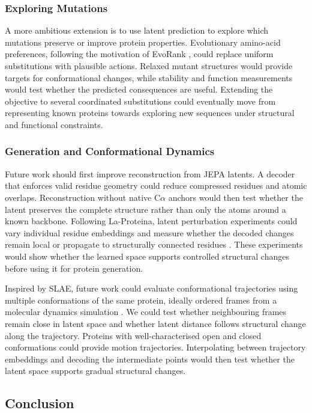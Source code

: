 \subsubsection{Exploring Mutations}

A more ambitious extension is to use latent prediction to explore which mutations preserve or improve protein properties. Evolutionary amino-acid preferences, following the motivation of EvoRank \citep{gong2024evorank}, could replace uniform substitutions with plausible actions. Relaxed mutant structures would provide targets for conformational changes, while stability and function measurements would test whether the predicted consequences are useful. Extending the objective to several coordinated substitutions could eventually move from representing known proteins towards exploring new sequences under structural and functional constraints.

\subsubsection{Generation and Conformational Dynamics}

Future work should first improve reconstruction from JEPA latents. A decoder that enforces valid residue geometry could reduce compressed residues and atomic overlaps. Reconstruction without native C$\alpha$ anchors would then test whether the latent preserves the complete structure rather than only the atoms around a known backbone. Following La-Proteina, latent perturbation experiments could vary individual residue embeddings and measure whether the decoded changes remain local or propagate to structurally connected residues \citep{la-proteina}. These experiments would show whether the learned space supports controlled structural changes before using it for protein generation.

Inspired by SLAE, future work could evaluate conformational trajectories using multiple conformations of the same protein, ideally ordered frames from a molecular dynamics simulation \citep{chen2026slae}. We could test whether neighbouring frames remain close in latent space and whether latent distance follows structural change along the trajectory. Proteins with well-characterised open and closed conformations could provide motion trajectories. Interpolating between trajectory embeddings and decoding the intermediate points would then test whether the latent space supports gradual structural changes.

\subsection{Conclusion}

